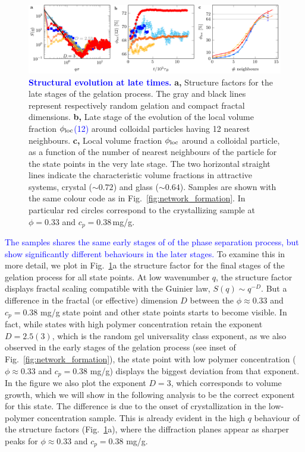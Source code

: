 \documentclass[preprint,amsmath,amssymb,superscriptaddress]{revtex4-1}
\begin{document}
\begin{figure}
 \includegraphics[width=16cm]{late_structure.pdf}
 \caption{\textcolor{blue}{{\bf Structural evolution at late times.}} 
{\bf a,} Structure factors for the late stages of the gelation process. The gray and black lines represent respectively random gelation and compact fractal dimensions.
{\bf b,} Late stage of the evolution of the local volume fraction \textcolor{blue}{$\phi_{\rm loc}$(12)} around colloidal particles having 12 nearest neighbours.
{\bf c,} Local volume fraction \textcolor{blue}{$\phi_{\rm loc}$} around a colloidal particle, as a function of the number of nearest neighbours of the particle for the state points in the very late stage. 
The two horizontal straight lines indicate the characteristic volume fractions in attractive systems, crystal ($\sim 0.72$) and glass ($\sim 0.64$).
Samples are shown with the same colour code as in Fig.~\ref{fig:network_formation}. In particular red circles correspond to the crystallizing sample at $\phi=0.33$ and $c_p=0.38\,$mg/g.
 }
 \label{fig:late_structure}
\end{figure}

\textcolor{blue}{The samples shares the same early stages of of the phase separation process, but show significantly different behaviours in the later stages.}
To examine this in more detail, we plot in Fig.~\ref{fig:late_structure}a the structure factor for the final stages of the gelation process for all state points.
At low wavenumber $q$, the structure factor displays fractal scaling compatible with the Guinier law, $S(q)\sim q^{-D}$.
But a difference in the fractal (or effective) dimension $D$ between the $\phi\approx 0.33$ and $c_p=0.38$ mg/g state point and other state points starts to become visible. In fact, while states
with high polymer concentration retain the exponent $D=2.5(3)$, 
which is the random gel universality class exponent, as we also observed in the early stages of the gelation process (see inset of Fig.~\ref{fig:network_formation}),
the state point with low polymer concentration ($\phi\approx 0.33$ and $c_p=0.38$ mg/g) displays the biggest deviation from that exponent. In the figure we also
plot the exponent $D=3$, which corresponds to volume growth, which we will show in the following analysis to be the correct exponent for this state. 
The difference is due to the onset of crystallization in the low-polymer concentration sample. This is already evident in the high $q$ behaviour of
the structure factors (Fig.~\ref{fig:late_structure}a), where the diffraction planes appear as sharper peaks for $\phi\approx 0.33$ and $c_p=0.38$ mg/g.
\end{document}
